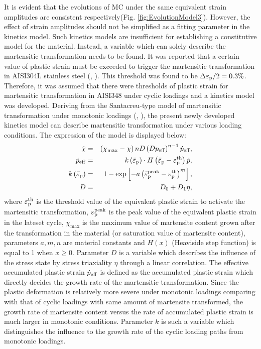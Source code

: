 \documentclass[final,5p,times,onecolumn,10pt,sort&compress]{elsarticle}
\begin{document}
 It is evident that the evolutions of MC under the same equivalent strain amplitudes are consistent respectively(Fig. \ref{fig:EvolutionModel3}). However, the effect of strain amplitudes should not be simplified as a fitting parameter in the kinetics model. Such kinetics models are insufficient for establishing a constitutive model for the material. Instead, a variable which can solely describe the martensitic transformation needs to be found. It was reported that a certain value of plastic strain must be exceeded to trigger the martensitic transformation in AISI304L stainless steel (\citeauthor{Bayerlein1989Plasticity}, \citeyear{Bayerlein1989Plasticity}). This threshold was found to be $\Delta \varepsilon _{\rm p}/2=0.3\%$. Therefore, it was assumed that there were thresholds of plastic strain for martensitic transformation in AISI348 under cyclic loadings and a kinetics model was developed. Deriving from the Santacreu-type model of martensitic transformation under monotonic loadings (\citeauthor{QSP2014}, \citeyear{QSP2014}), the present newly developed kinetics model can describe martensitic transformation under various loading conditions. The expression of the model is displayed below:
\begin{eqnarray}\label{eq:Kinetics model3}
\dot \chi &=&\left(\chi_{\max }-\chi\right) nD \left(D p_{\rm eff}\right)^{n-1}\dot p_{\rm eff},
\\
\dot{p}_{\rm eff}&=&k\left ( \bar{\varepsilon}_{\rm p} \right ) \cdot H\left(\bar{\varepsilon}_{\rm p}-\varepsilon_{\rm p}^{\rm th}\right) \dot{p} ,
\\
k\left ( \bar{\varepsilon}_{\rm p} \right )&=&1-\exp \left[-a\left(\bar{\varepsilon}_{\rm p}^{\rm peak}-\varepsilon_{\rm p}^{\rm th}\right)^{m}\right] ,
\\
D&=&D_{0}+D_{1}\eta,
\end{eqnarray}
where $\varepsilon_{\rm p}^{\rm th}$ is the threshold value of the equivalent plastic strain to activate the martensitic transformation, $\varepsilon_{\rm p}^{\rm peak}$ is the peak value of the equivalent plastic strain in the lateset cycle, $\chi_{\max}$ is the maximum value of martensite content grown after the transformation in the material (or saturation value of martensite content), parameters $a,m,n$ are material constants and $H\left  ( x \right )$ (Heaviside step function) is equal to 1 when $x\geq0$. Parameter $D$ is a variable which describes the influence of the stress state by stress triaxiality $\eta$ through a linear correlation. The effective accumulated plastic strain $\dot{p}_{\rm eff}$ is defined as the accumulated plastic strain which directly decides the growth rate of the martensitic transformation. Since the plastic deformation is relatively more severe under monotonic loadings comparing with that of cyclic loadings with same amount of martensite transformed, the growth rate of martensite content versus the rate of accumulated plastic strain is much larger in monotonic conditions. Parameter $k$ is such a variable which distinguishes the influence to the growth rate of the cyclic loading paths from monotonic loadings.
\end{document}
